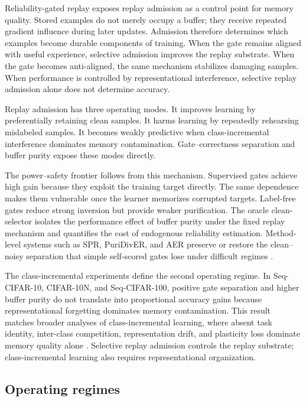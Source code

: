 \documentclass[preprint,12pt]{elsarticle}
\begin{document}
Reliability-gated replay exposes replay admission as a control point for memory quality. Stored examples do not merely occupy a buffer; they receive repeated gradient influence during later updates. Admission therefore determines which examples become durable components of training. When the gate remains aligned with useful experience, selective admission improves the replay substrate. When the gate becomes anti-aligned, the same mechanism stabilizes damaging samples. When performance is controlled by representational interference, selective replay admission alone does not determine accuracy.

Replay admission has three operating modes. It improves learning by preferentially retaining clean samples. It harms learning by repeatedly rehearsing mislabeled samples. It becomes weakly predictive when class-incremental interference dominates memory contamination. Gate--correctness separation and buffer purity expose these modes directly.

The power--safety frontier follows from this mechanism. Supervised gates achieve high gain because they exploit the training target directly. The same dependence makes them vulnerable once the learner memorizes corrupted targets. Label-free gates reduce strong inversion but provide weaker purification. The oracle clean-selector isolates the performance effect of buffer purity under the fixed replay mechanism and quantifies the cost of endogenous reliability estimation. Method-level systems such as SPR, PuriDivER, and AER preserve or restore the clean--noisy separation that simple self-scored gates lose under difficult regimes \cite{Kim2021SPR,Bang2022PuriDivER,Millunzi2024AER}.

The class-incremental experiments define the second operating regime. In Seq-CIFAR-10, CIFAR-10N, and Seq-CIFAR-100, positive gate separation and higher buffer purity do not translate into proportional accuracy gains because representational forgetting dominates memory contamination. This result matches broader analyses of class-incremental learning, where absent task identity, inter-class competition, representation drift, and plasticity loss dominate memory quality alone \cite{Masana2023ClassIncrementalSurvey,VanDeVen2022ThreeTypes,Dohare2024LossOfPlasticity}. Selective replay admission controls the replay substrate; class-incremental learning also requires representational organization.

\subsection{Operating regimes}
\end{document}
